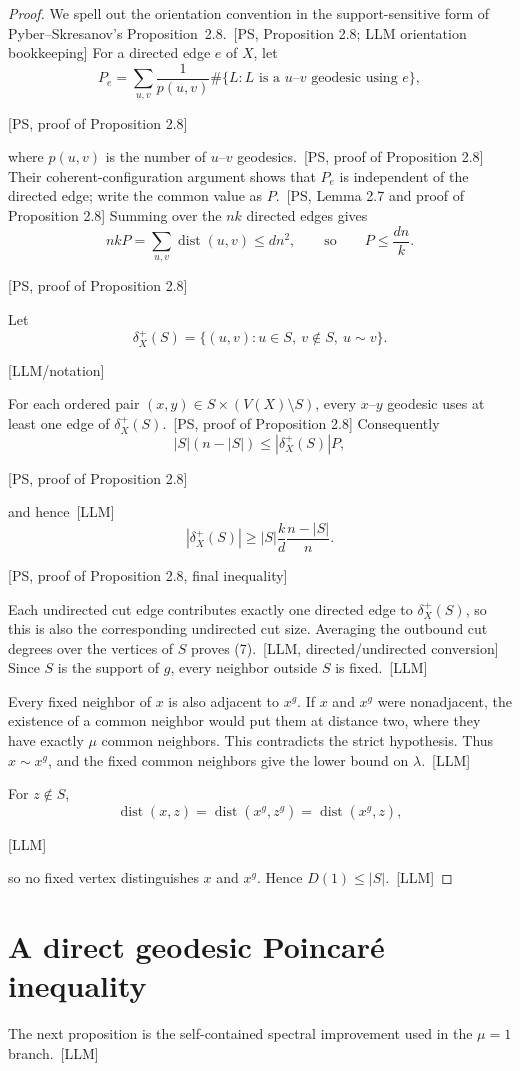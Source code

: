 \documentclass[10pt]{amsart}
\theoremstyle{remark}
\DeclareMathOperator{\dist}{dist}
\newcommand{\prov}[1]{\unskip\, {\normalfont\scriptsize\color{provgray}\textsf{[#1]}}}
\newcommand{\eqprov}[1]{%
  \par\nobreak\vspace{-0.68\baselineskip}%
  \noindent\hfill{\normalfont\scriptsize\color{provgray}\textsf{[#1]}}%
  \par\vspace{0.20\baselineskip}%
}
\begin{document}
\begin{proof}
We spell out the orientation convention in the support-sensitive form of Pyber--Skresanov's Proposition~2.8.\prov{PS, Proposition 2.8; LLM orientation bookkeeping} For a directed edge $e$ of $X$, let
\[
P_e=\sum_{u,v}\frac{1}{p(u,v)}\#\{L:L\text{ is a }u\text{--}v\text{ geodesic using }e\},
\]
\eqprov{PS, proof of Proposition 2.8}
where $p(u,v)$ is the number of $u$--$v$ geodesics.\prov{PS, proof of Proposition 2.8} Their coherent-configuration argument shows that $P_e$ is independent of the directed edge; write the common value as $P$.\prov{PS, Lemma 2.7 and proof of Proposition 2.8} Summing over the $nk$ directed edges gives
\[
nkP=\sum_{u,v}\dist(u,v)\le dn^2,
\qquad\text{so}\qquad P\le\frac{dn}{k}.
\]
\eqprov{PS, proof of Proposition 2.8}
Let
\[
\delta_X^+(S)=\{(u,v):u\in S,\ v\notin S,\ u\sim v\}.
\]
\eqprov{LLM/notation}
For each ordered pair $(x,y)\in S\times(V(X)\setminus S)$, every $x$--$y$ geodesic uses at least one edge of $\delta_X^+(S)$.\prov{PS, proof of Proposition 2.8} Consequently
\[
|S|(n-|S|)\le|\delta_X^+(S)|P,
\]
\eqprov{PS, proof of Proposition 2.8}
and hence\prov{LLM}
\begin{equation}
|\delta_X^+(S)|\ge |S|\frac{k}{d}\frac{n-|S|}{n}.
\end{equation}
\eqprov{PS, proof of Proposition 2.8, final inequality}
Each undirected cut edge contributes exactly one directed edge to $\delta_X^+(S)$, so this is also the corresponding undirected cut size. Averaging the outbound cut degrees over the vertices of $S$ proves (7).\prov{LLM, directed/undirected conversion} Since $S$ is the support of $g$, every neighbor outside $S$ is fixed.\prov{LLM}

Every fixed neighbor of $x$ is also adjacent to $x^g$. If $x$ and $x^g$ were nonadjacent, the existence of a common neighbor would put them at distance two, where they have exactly $\mu$ common neighbors. This contradicts the strict hypothesis. Thus $x\sim x^g$, and the fixed common neighbors give the lower bound on $\lambda$.\prov{LLM}

For $z\notin S$,
\[
\dist(x,z)=\dist(x^g,z^g)=\dist(x^g,z),
\]
\eqprov{LLM}
so no fixed vertex distinguishes $x$ and $x^g$. Hence $D(1)\le|S|$.\prov{LLM}
\end{proof}

\section{A direct geodesic Poincar\'e inequality}
The next proposition is the self-contained spectral improvement used in the $\mu=1$ branch.\prov{LLM}
\end{document}
